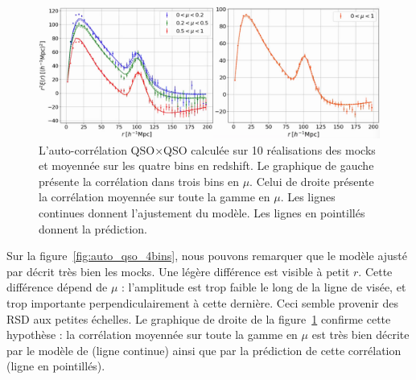 \begin{figure}
  \centering
  \includegraphics[scale=0.4]{auto_qso}
  \caption{L'auto-corrélation QSO$\times$QSO calculée sur 10 réalisations des mocks et moyennée sur les quatre bins en redshift. Le graphique de gauche présente la corrélation dans trois bins en $\mu$. Celui de droite présente la corrélation moyennée sur toute la gamme en $\mu$. Les lignes continues donnent l'ajustement du modèle. Les lignes en pointillés donnent la prédiction.}
  \label{fig:auto_qso}
\end{figure}

Sur la figure~\ref{fig:auto_qso_4bins}, nous pouvons remarquer que le modèle ajusté par \picca{} décrit très bien les mocks. Une légère différence est visible à petit $r$. Cette différence dépend de $\mu$ : l'amplitude est trop faible le long de la ligne de visée, et trop importante perpendiculairement à cette dernière. Ceci semble provenir des RSD aux petites échelles.
Le graphique de droite de la figure~\ref{fig:auto_qso} confirme cette hypothèse : la corrélation moyennée sur toute la gamme en $\mu$ est très bien décrite par le modèle de \picca{} (ligne continue) ainsi que par la prédiction de cette corrélation (ligne en pointillés).


